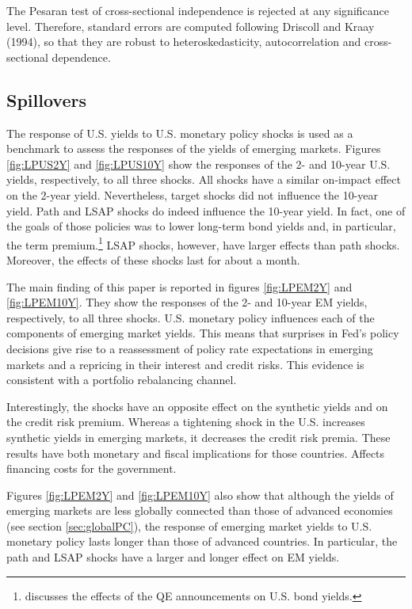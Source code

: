 {The Pesaran test of cross-sectional independence is rejected at any significance level.
Therefore, standard errors are computed following Driscoll and Kraay (1994), so that they are robust to heteroskedasticity, autocorrelation and cross-sectional dependence.

\subsection{Spillovers}
The response of U.S. yields to U.S. monetary policy shocks is used as a benchmark to assess the responses of the yields of emerging markets.
Figures \ref{fig:LPUS2Y} and \ref{fig:LPUS10Y} show the responses of the 2- and 10-year U.S. yields, respectively, to all three shocks.
All shocks have a similar on-impact effect on the 2-year yield.
Nevertheless, target shocks did not influence the 10-year yield.
Path and LSAP shocks do indeed influence the 10-year yield.
In fact, one of the goals of those policies was to lower long-term bond yields and, in particular, the term premium.\footnote{ \cite{Kuttner:2018} discusses the effects of the QE announcements on U.S. bond yields.}
LSAP shocks, however, have larger effects than path shocks.
Moreover, the effects of these shocks last for about a month.

The main finding of this paper is reported in figures \ref{fig:LPEM2Y} and \ref{fig:LPEM10Y}.
They show the responses of the 2- and 10-year EM yields, respectively, to all three shocks.
U.S. monetary policy influences each of the components of emerging market yields.
This means that surprises in Fed's policy decisions give rise to a reassessment of policy rate expectations in emerging markets and a repricing in their interest and credit risks.
This evidence is consistent with a portfolio rebalancing channel.

Interestingly, the shocks have an opposite effect on the synthetic yields and on the credit risk premium.
Whereas a tightening shock in the U.S. increases synthetic yields in emerging markets, it decreases the credit risk premia.
These results have both monetary and fiscal implications for those countries.
Affects financing costs for the government.

Figures \ref{fig:LPEM2Y} and \ref{fig:LPEM10Y} also show that although the yields of emerging markets are less globally connected than those of advanced economies (see section \ref{sec:globalPC}), the response of emerging market yields to U.S. monetary policy lasts longer than those of advanced countries.
In particular, the path and LSAP shocks have a larger and longer effect on EM yields. 

}
